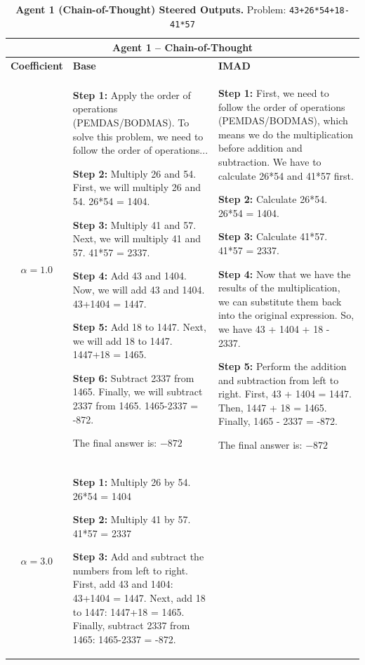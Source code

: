 \begin{table}[t]
\centering
\caption{\textbf{Agent 1 (Chain-of-Thought) Steered Outputs.} Problem: \texttt{43+26*54+18-41*57}}
\label{tab:agent1_examples}
\begin{tabularx}{\textwidth}{c|X|X}
\multicolumn{3}{c}{\textbf{Agent 1 -- Chain-of-Thought}} \\
\hline
\textbf{Coefficient} & \textbf{Base} & \textbf{IMAD} \\
\hline
$\alpha = 1.0$ & 
\textbf{Step 1:} Apply the order of operations (PEMDAS/BODMAS). To solve this problem, we need to follow the order of operations...

\textbf{Step 2:} Multiply 26 and 54. First, we will multiply 26 and 54. 26*54 = 1404.

\textbf{Step 3:} Multiply 41 and 57. Next, we will multiply 41 and 57. 41*57 = 2337.

\textbf{Step 4:} Add 43 and 1404. Now, we will add 43 and 1404. 43+1404 = 1447.

\textbf{Step 5:} Add 18 to 1447. Next, we will add 18 to 1447. 1447+18 = 1465.

\textbf{Step 6:} Subtract 2337 from 1465. Finally, we will subtract 2337 from 1465. 1465-2337 = -872.

The final answer is: $\boxed{-872}$
& 
\textbf{Step 1:} First, we need to follow the order of operations (PEMDAS/BODMAS), which means we do the multiplication before addition and subtraction. We have to calculate 26*54 and 41*57 first.

\textbf{Step 2:} Calculate 26*54. 26*54 = 1404.

\textbf{Step 3:} Calculate 41*57. 41*57 = 2337.

\textbf{Step 4:} Now that we have the results of the multiplication, we can substitute them back into the original expression. So, we have 43 + 1404 + 18 - 2337.

\textbf{Step 5:} Perform the addition and subtraction from left to right. First, 43 + 1404 = 1447. Then, 1447 + 18 = 1465. Finally, 1465 - 2337 = -872.

The final answer is: $\boxed{-872}$
\\
\hline
$\alpha = 3.0$ & 
\textbf{Step 1:} Multiply 26 by 54. 26*54 = 1404

\textbf{Step 2:} Multiply 41 by 57. 41*57 = 2337

\textbf{Step 3:} Add and subtract the numbers from left to right. First, add 43 and 1404: 43+1404 = 1447. Next, add 18 to 1447: 1447+18 = 1465. Finally, subtract 2337 from 1465: 1465-2337 = -872.


\end{tabularx}
\end{table}
